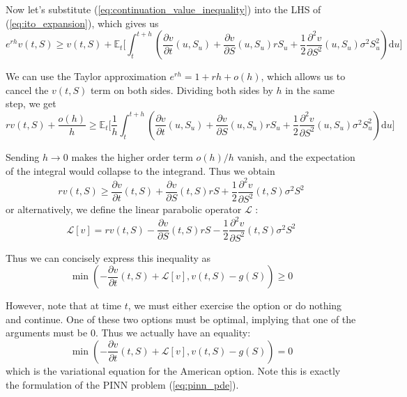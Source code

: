 Now let’s substitute (\ref{eq:continuation_value_inequality}) into the LHS of (\ref{eq:ito_expansion}), which gives us
\begin{equation}
    e^{rh}v(t, S) \ge v(t, S) + \mathbb E_t\bigg[\int_t^{t+h} \left(\frac{\partial v}{\partial t}(u, S_u) + \frac{\partial v}{\partial S}(u, S_u) r S_u + \frac{1}{2}\frac{\partial ^2v}{\partial S^2}(u, S_u) \sigma^2 S_u^2\right)\mathrm du\bigg]
\end{equation}

We can use the Taylor approximation $e^{rh} = 1 + rh + o(h)$, which allows us to cancel the $v(t, S)$ term on both sides. Dividing both sides by $h$ in the same step, we get
\begin{equation}
    rv(t, S) + \frac{o(h)}{h} \ge \mathbb E_t\bigg[\frac 1h\int_t^{t+h} \left(\frac{\partial v}{\partial t}(u, S_u) + \frac{\partial v}{\partial S}(u, S_u) r S_u + \frac{1}{2}\frac{\partial ^2v}{\partial S^2}(u, S_u) \sigma^2 S_u^2\right)\mathrm du\bigg]
\end{equation}

Sending $h \to 0$ makes the higher order term $o(h)/h$ vanish, and the expectation of the integral would collapse to the integrand. Thus we obtain
\begin{equation}
    rv(t, S) \ge \frac{\partial v}{\partial t}(t, S) + \frac{\partial v}{\partial S}(t, S) r S + \frac{1}{2}\frac{\partial ^2v}{\partial S^2}(t, S) \sigma^2 S^2
\end{equation}
or alternatively, we define the linear parabolic operator $\mathcal L$ \cite{zhao2025fractional}:
\begin{equation}
    \mathcal L[v] = rv(t, S) - \frac{\partial v}{\partial S}(t, S) r S - \frac{1}{2}\frac{\partial ^2v}{\partial S^2}(t, S) \sigma^2 S^2
\label{eq:bs_operator}
\end{equation}

Thus we can concisely express this inequality as
\begin{equation}
    \min\left(-\frac{\partial v}{\partial t}(t, S) + \mathcal L[v], v(t, S) - g(S)\right) \ge 0
\end{equation}

However, note that at time $t$, we must either exercise the option or do nothing and continue. One of these two options must be optimal, implying that one of the arguments must be $0$. Thus we actually have an equality:
\begin{equation}
    \min\left(-\frac{\partial v}{\partial t}(t, S) + \mathcal L[v], v(t, S) - g(S)\right) = 0
\label{eq:variational_inequality_bs_1d}
\end{equation}
which is the variational equation \cite{jo2019variational} for the American option. Note this is exactly the formulation of the PINN problem (\ref{eq:pinn_pde}).

